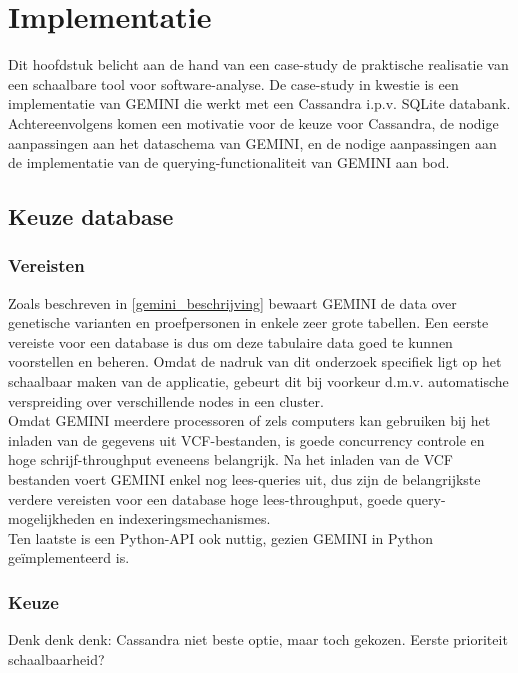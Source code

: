 \chapter{Implementatie}
\label{implementatie}

Dit hoofdstuk belicht aan de hand van een case-study de praktische realisatie van een schaalbare tool voor software-analyse. De case-study in kwestie is een implementatie van GEMINI die werkt met een Cassandra i.p.v. SQLite databank. Achtereenvolgens komen een motivatie voor de keuze voor Cassandra, de nodige aanpassingen aan het dataschema van GEMINI, en de nodige aanpassingen aan de implementatie van de querying-functionaliteit van GEMINI aan bod.

\section{Keuze database}

\subsection{Vereisten}

Zoals beschreven in \ref{gemini_beschrijving} bewaart GEMINI de data over genetische varianten en proefpersonen in enkele zeer grote tabellen. Een eerste vereiste voor een database is dus om deze tabulaire data goed te kunnen voorstellen en beheren. Omdat de nadruk van dit onderzoek specifiek ligt op het schaalbaar maken van de applicatie, gebeurt dit bij voorkeur d.m.v. automatische verspreiding over verschillende nodes in een cluster.\\
Omdat GEMINI meerdere processoren of zels computers kan gebruiken bij het inladen van de gegevens uit VCF-bestanden, is goede concurrency controle en hoge schrijf-throughput eveneens belangrijk. Na het inladen van de VCF bestanden voert GEMINI enkel nog lees-queries uit, dus zijn de belangrijkste verdere vereisten voor een database hoge lees-throughput, goede query-mogelijkheden en indexeringsmechanismes.
\\Ten laatste is een Python-API ook nuttig, gezien GEMINI in Python ge\"implementeerd is.

\subsection{Keuze}

Denk denk denk: Cassandra niet beste optie, maar toch gekozen. Eerste prioriteit schaalbaarheid?

